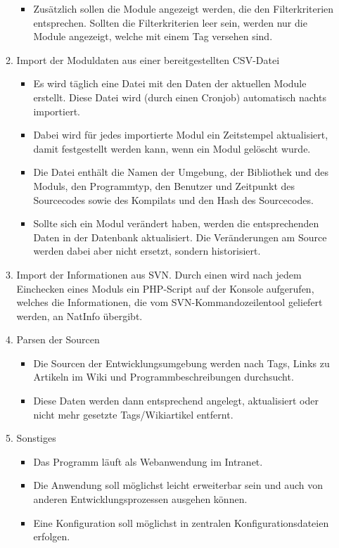 \begin{enumerate}[itemsep=0em,partopsep=0em,parsep=0em,topsep=0em]
\begin{enumerate}
\begin{itemize}
		\item Zusätzlich sollen die Module angezeigt werden, die den Filterkriterien entsprechen. Sollten die Filterkriterien leer sein, werden nur die Module angezeigt, welche mit einem Tag versehen sind.
		\end{itemize}
	\item Import der Moduldaten aus einer bereitgestellten \acs{CSV}-Datei
		\begin{itemize}
		\item Es wird täglich eine Datei mit den Daten der aktuellen Module erstellt. Diese Datei wird (durch einen Cronjob) automatisch nachts importiert.
		\item Dabei wird für jedes importierte Modul ein Zeitstempel aktualisiert, damit festgestellt werden kann, wenn ein Modul gelöscht wurde.
		\item Die Datei enthält die Namen der Umgebung, der Bibliothek und des Moduls, den Programmtyp, den Benutzer und Zeitpunkt des Sourcecodes sowie des Kompilats und den Hash des Sourcecodes.
		\item Sollte sich ein Modul verändert haben, werden die entsprechenden Daten in der Datenbank aktualisiert. Die Veränderungen am Source werden dabei aber nicht ersetzt, sondern historisiert.
		\end{itemize}
	\item Import der Informationen aus \ac{SVN}. Durch einen  wird nach jedem Einchecken eines Moduls ein \acs{PHP}-Script auf der Konsole aufgerufen, welches die Informationen, die vom \ac{SVN}-Kommandozeilentool geliefert werden, an \acs{NatInfo} übergibt.
	\item Parsen der Sourcen
		\begin{itemize}
		\item Die Sourcen der Entwicklungsumgebung werden nach Tags, Links zu Artikeln im Wiki und Programmbeschreibungen durchsucht.
		\item Diese Daten werden dann entsprechend angelegt, aktualisiert oder nicht mehr gesetzte Tags/Wikiartikel entfernt.
		\end{itemize}
	\item Sonstiges
		\begin{itemize}
		\item Das Programm läuft als Webanwendung im Intranet.
		\item Die Anwendung soll möglichst leicht erweiterbar sein und auch von anderen Entwicklungsprozessen ausgehen können.
		\item Eine Konfiguration soll möglichst in zentralen Konfigurationsdateien erfolgen.
		\end{itemize}
	\end{enumerate}
\end{enumerate}

